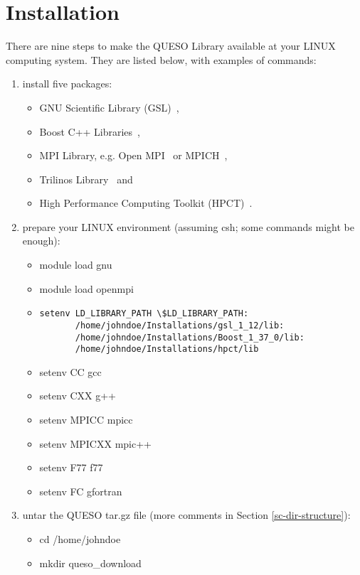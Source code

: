 \chapter{Installation}\label{ch-install}
\thispagestyle{headings}

There are nine steps to make the QUESO Library available at your LINUX computing system.
They are listed below, with examples of commands:
%
\begin{enumerate}
\item {install five packages:
\begin{itemize}
\item GNU Scientific Library (GSL)~\cite{gsl},
\item Boost C++ Libraries~\cite{boost}, 
\item MPI Library, e.g. Open MPI~\cite{Openmpi} or MPICH~\cite{Mpich},
\item Trilinos Library~\cite{Trilinos} and
\item High Performance Computing Toolkit (HPCT)~\cite{hpct}.
\end{itemize}
}
\item {prepare your LINUX environment (assuming csh; some commands might be enough):
\begin{itemize}
\item module load gnu
\item module load openmpi
\item {
\begin{verbatim}
setenv LD_LIBRARY_PATH \$LD_LIBRARY_PATH:
       /home/johndoe/Installations/gsl_1_12/lib:
       /home/johndoe/Installations/Boost_1_37_0/lib:
       /home/johndoe/Installations/hpct/lib
\end{verbatim}
}
\item setenv CC gcc
\item setenv CXX g++
\item setenv MPICC mpicc
\item setenv MPICXX mpic++
\item setenv F77 f77
\item setenv FC gfortran
\end{itemize}
}
\item {untar the QUESO tar.gz file (more comments in Section \ref{sc-dir-structure}):
\begin{itemize}
\item cd /home/johndoe
\item mkdir queso\_download

\end{itemize}}
\end{enumerate}
